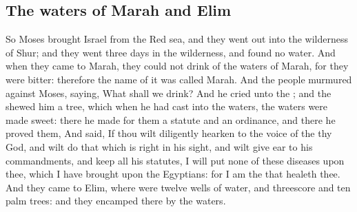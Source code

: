 \begin{biblechapter}
\section*{The waters of Marah and Elim}
\verse So Moses brought Israel from the Red sea, and they went out into the wilderness of Shur; and they went three days in the wilderness, and found no water.
\verse And when they came to Marah, they could not drink of the waters of Marah, for they were bitter: therefore the name of it was called Marah.
\verse And the people murmured against Moses, saying, What shall we drink?
\verse And he cried unto the \LORD; and the \LORD shewed him a tree, which when he had cast into the waters, the waters were made sweet: there he made for them a statute and an ordinance, and there he proved them,
\verse And said, If thou wilt diligently hearken to the voice of the \LORD thy God, and wilt do that which is right in his sight, and wilt give ear to his commandments, and keep all his statutes, I will put none of these diseases upon thee, which I have brought upon the Egyptians: for I am the \LORD that healeth thee.
\verse And they came to Elim, where were twelve wells of water, and threescore and ten palm trees: and they encamped there by the waters.
\end{biblechapter}

\flushcolsend\columnbreak %

